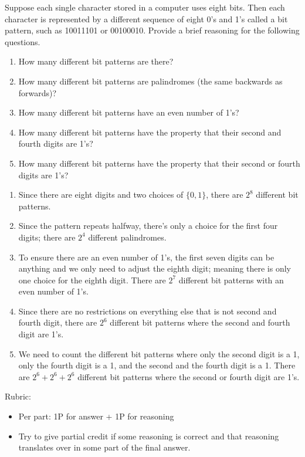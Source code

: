 \documentclass{article}
\theoremstyle{definition}
\begin{document}
\begin{question}
    Suppose each single character stored in a computer uses eight bits. 
    Then each character is represented by a different sequence of eight 0's and 1's called a bit pattern, 
    such as 10011101 or 00100010. Provide a brief reasoning for the following questions.
        \begin{enumerate}
            \item How many different bit patterns are there?
            \item How many different bit patterns are palindromes (the same backwards as forwards)?
            \item How many different bit patterns have an even number of 1's?
            \item How many different bit patterns have the property that their second and fourth digits are 1's?
            \item How many different bit patterns have the property that their second or fourth digits are 1's?
        \end{enumerate}
\end{question}
\begin{solution}
    \begin{enumerate}
        \item Since there are eight digits and two choices of $\{0, 1\}$, there are $2^8$ different bit patterns. 
        \item Since the pattern repeats halfway, there's only a choice for the first four digits; there are $2^4$ different palindromes.
        \item To ensure there are an even number of 1's, the first seven digits can be anything and we only need to adjust the eighth digit; meaning there is only one choice for the eighth digit. There are $2^7$ different bit patterns with an even number of 1's.
        \item Since there are no restrictions on everything else that is not second and fourth digit, there are $2^6$ different bit patterns where the second and fourth digit are 1's.
        \item We need to count the different bit patterns where only the second digit is a 1, only the fourth digit is a 1, and the second and the fourth digit is a 1. There are $2^6+2^6+2^6$ different bit patterns where the second or fourth digit are 1's.
    \end{enumerate}
    
{\color{red} Rubric:
\begin{itemize}
\item Per part: 1P for answer + 1P for reasoning
\item Try to give partial credit if some reasoning is correct and that reasoning translates over in some part of the final answer.
\end{itemize}}
\end{solution}
\end{document}
